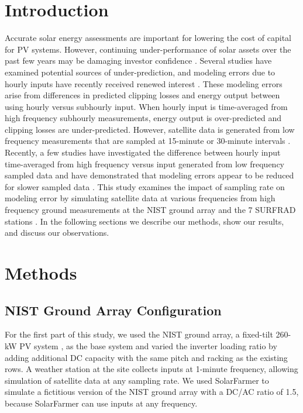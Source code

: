 \documentclass[conference]{IEEEtran}
\begin{document}
\section{Introduction}
Accurate solar energy assessments are important for lowering the cost of capital for PV systems. However, continuing under-performance of solar assets over the past few years may be damaging investor confidence \cite{Matsui2021}. Several studies have examined potential sources of under-prediction, and modeling errors due to hourly inputs have recently received renewed interest \cite{Parikh2021,Anderson2020,Bradford2020,Kharait2020,Cormode2019}. These modeling errors arise from differences in predicted clipping losses and energy output between using hourly versus subhourly input. When hourly input is time-averaged from high frequency subhourly measurements, energy output is over-predicted and clipping losses are under-predicted. However, satellite data is generated from low frequency measurements that are sampled at 15-minute or 30-minute intervals \cite{Wilcox2012,Sengupta2018}. Recently, a few studies have investigated the difference between hourly input time-averaged from high frequency versus input generated from low frequency sampled data and have demonstrated that modeling errors appear to be reduced for slower sampled data \cite{Bowersox2021}. This study examines the impact of sampling rate on modeling error by simulating satellite data at various frequencies from high frequency ground measurements at the NIST ground array \cite{Boyd2017,Boyd2017a,Boyd2017b} and the 7 SURFRAD stations \cite{Augustine2000}. In the following sections we describe our methods, show our results, and discuss our observations.

\section{Methods}

\subsection{NIST Ground Array Configuration}
For the first part of this study, we used the NIST ground array, a fixed-tilt 260-kW PV system \cite{Boyd2017,Boyd2017a,Boyd2017b}, as the base system and varied the inverter loading ratio by adding additional DC capacity with the same pitch and racking as the existing rows. A weather station at the site collects inputs at 1-minute frequency, allowing simulation of satellite data at any sampling rate. We used SolarFarmer \cite{solarfarmer2018} to simulate a fictitious version of the NIST ground array with a DC/AC ratio of 1.5, because SolarFarmer can use inputs at any frequency.
\end{document}
